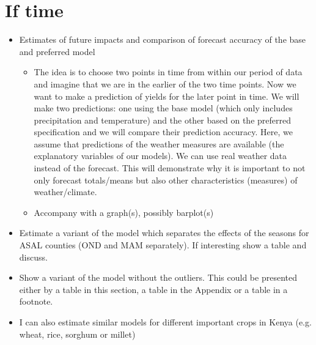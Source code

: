 \documentclass[a4paper,12pt]{article}
\begin{document}
\section*{If time}\label{iftime:}
\color{violet}
\begin{itemize}
\item Estimates of future impacts and comparison of forecast accuracy of the base and preferred model
\begin{itemize}
\item The idea is to choose two points in time from within our period of data and imagine that we are in the earlier of the two time points. Now we want to make a prediction of yields for the later point in time. We will make two predictions: one using the base model (which only includes precipitation and temperature) and the other based on the preferred specification and we will compare their prediction accuracy. Here, we assume that predictions of the weather measures are available (the explanatory variables of our models). We can use real weather data instead of the forecast. This will demonstrate why it is important to not only forecast totals/means but also other characteristics (measures) of weather/climate.
		\item Accompany with a graph(s), possibly barplot(s)
\end{itemize}

\item Estimate a variant of the model which separates the effects of the seasons for ASAL counties (OND and MAM separately). If interesting show a table and discuss.

\item Show a variant of the model without the outliers. This could be presented either by a table in this section, a table in the Appendix or a table in a footnote. 

\item I can also estimate similar models for different important crops in Kenya (e.g. wheat, rice, sorghum or millet)


\end{itemize}
\color{black}
\FloatBarrier
\pagebreak






\end{document}
